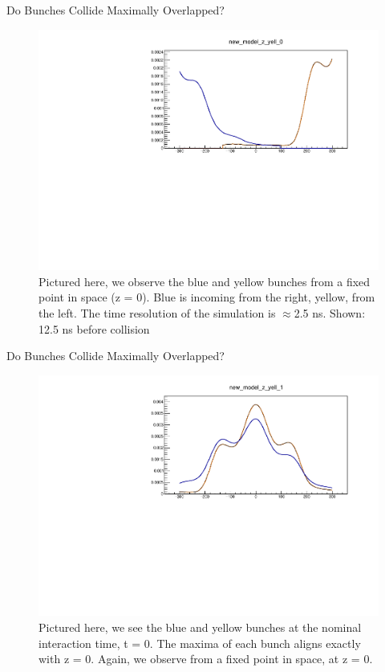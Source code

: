 \begin{frame}{Do Bunches Collide Maximally Overlapped?}
\begin{figure}
\begin{center}
\includegraphics[width=0.8\linewidth]{../ExploringZProfile/figs/359711_time_step_0_bunch_collision.pdf}
\end{center}
\caption{Pictured here, we observe the blue and yellow bunches from a fixed
point in space (z = 0). Blue is incoming from the right, yellow, from the left.
The time resolution of the simulation is $\approx$2.5 ns. Shown: 12.5 ns before
collision }
\label{fig:359711_time_step_0_bunch_collision}
\end{figure}
\end{frame}

\begin{frame}{Do Bunches Collide Maximally Overlapped?}
\begin{figure}
\begin{center}
\includegraphics[width=0.8\linewidth]{../ExploringZProfile/figs/359711_time_step_1_bunch_collision.pdf}
\end{center}
\caption{Pictured here, we see the blue and yellow bunches at the nominal
interaction time, t = 0. The maxima of each bunch aligns exactly with z = 0.
Again, we observe from a fixed point in space, at z = 0. }
\label{fig:359711_time_step_1_bunch_collision}
\end{figure}
\end{frame}

